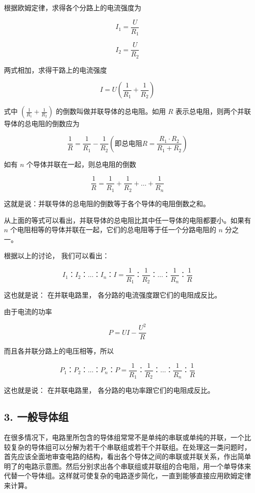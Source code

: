 根据欧姆定律，求得各个分路上的电流强度为

\[
I_{1} = \frac{U}{R_{1}}
\]

\[
I_{2} = \frac{U}{R_{2}}
\]

两式相加，求得干路上的电流强度

\[
I = U \left(\frac{1}{R_{1}} + \frac{1}{R_{2}}\right)
\]

式中 \(\left(\frac{1}{R_1} + \frac{1}{R_2}\right)\)
的倒数叫做并联导体的总电阻。如用 \(R\)
表示总电阻，则两个并联导体的总电阻的倒数应为

\[
\frac{1}{R} = \frac{1}{R_{1}} - \frac{1}{R_{2}} (\text{即总电阻} R = \frac{R_{1} \cdot R_{2}}{R_{1} + R_{2}})
\]

如有 \(n\) 个导体并联在一起，则总电阻的倒数

\[
\frac{1}{R} = \frac{1}{R_{1}} + \frac{1}{R_{2}} + \dots + \frac{1}{R_{n}} \tag{2.3}
\]

这就是说：并联导体的总电阻的倒数等于各个导体的电阻倒数之和。

从上面的等式可以看出，并联导体的总电阻比其中任一导体的电阻都要小。如果有
\(n\) 个电阻相等的导体并联在一起，它们的总电阻等于任一个分路电阻的 \(n\)
分之一。

根据以上的讨论， 我们可以看出：

\[
I_{1}\text{：} I_{2}\text{：} \dots \text{：} I_{n}\text{：} I = \frac{1}{R_{1}}\text{：} \frac{1}{R_{2}}\text{：} \dots \text{：} \frac{1}{R_{n}}\text{：} \frac{1}{R}
\]

这也就是说： 在并联电路里， 各分路的电流强度跟它们的电阻成反比。

由于电流的功率

\[
P = U I - \frac{U^{2}}{R}
\]

而且各并联分路上的电压相等，所以

\[
P_{1}\text{：} P_{2}\text{：} \dots \text{：} P_{n}\text{：} P = \frac{1}{R_{1}}\text{：} \frac{1}{R_{2}}\text{：} \dots \text{：} \frac{1}{R_{n}}\text{：} \frac{1}{R}
\]

这也就是说： 在并联电路里， 各分路的电功率跟它们的电阻成反比。

\subsection{3. 一般导体组}\label{ux4e00ux822cux5bfcux4f53ux7ec4}

在很多情况下，电路里所包含的导体组常常不是单纯的串联或单纯的并联，一个比较复杂的导体组可以分解为若干个串联组或若干个并联组。在处理这一类问题时，首先应该全面地审查电路的结构，看出各个导体之间的串联或并联关系，作出简单明了的电路示意图。然后分别求出各个串联组或并联组的合电阻，用一个单导体来代替一个导体组。这样就可使复杂的电路逐步简化，一直到能够直接应用欧姆定律来计算。


